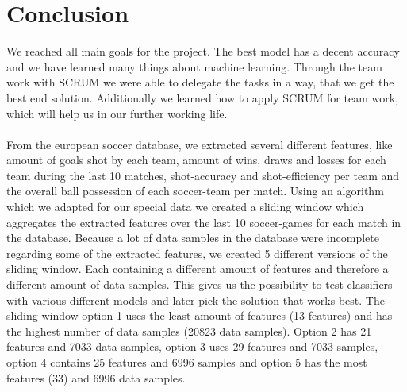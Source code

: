 
\chapter{Conclusion}
\label{chap:conclusion}
We reached all main goals for the project. The best model has a decent accuracy and we have learned many things about machine learning. Through the team work with SCRUM we were able to delegate the tasks in a way, that we get the best end solution. Additionally we learned how to apply SCRUM for team work, which will help us in our further working life. %
\\ \\
From the european soccer database, we extracted several different features, like amount of goals shot by each team, amount of wins, draws and losses for each team during the last 10 matches, shot-accuracy and shot-efficiency per team and the overall ball possession of each soccer-team per match.\newline
Using an algorithm which we adapted for our special data \cite{sliding01} we created a sliding window which aggregates the extracted features over the last 10 soccer-games for each match in the database. Because a lot of data samples in the database were incomplete regarding some of the extracted features, we created 5 different versions of the sliding window. Each containing a different amount of features and therefore a different amount of data samples. This gives us the possibility to test classifiers with various different models and later pick the solution that works best. The sliding window option 1 uses the least amount of features (13 features) and has the highest number of data samples (20823 data samples). Option 2 has 21 features and 7033 data samples, option 3 uses 29 features and 7033 samples, option 4 contains 25 features and 6996 samples and option 5 has the most features (33) and 6996 data samples.\\
